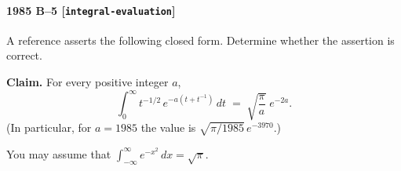 \paragraph{1985 B--5 \textnormal{[\texttt{integral-evaluation}]}}
A reference asserts the following closed form. Determine whether the
assertion is correct.

\textbf{Claim.} For every positive integer $a$,
\[
\int_0^\infty t^{-1/2}\, e^{-a(t + t^{-1})}\,dt \;=\;
\sqrt{\frac{\pi}{a}}\;e^{-2a}.
\]
(In particular, for $a = 1985$ the value is $\sqrt{\pi/1985}\,e^{-3970}$.)

You may assume that $\int_{-\infty}^\infty e^{-x^2}\,dx = \sqrt{\pi}$.
